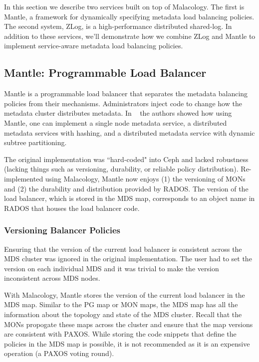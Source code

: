 \documentclass[preprint]{sigplanconf-eurosys}
\begin{document}
In this section we describe two services built on top of Malacology. The first
is Mantle, a framework for dynamically specifying metadata load balancing
policies. The second system, ZLog, is a high-performance distributed shared-log.
In addition to these services, we'll demonstrate how we combine ZLog and Mantle
to implement service-aware metadata load balancing policies.

\subsection{Mantle: Programmable Load Balancer}
\label{sec:mantle}

Mantle is a programmable load balancer that separates the metadata balancing
policies from their mechanisms. Administrators inject code to change how the
metadata cluster distributes metadata. In ~\cite{sevilla:sc15-mantle} the
authors showed how using Mantle, one can implement a single node metadata
service, a distributed metadata services with hashing, and a distributed
metadata service with dynamic subtree partitioning. 

The original implementation was ``hard-coded" into Ceph and lacked robustness
(lacking things such as versioning, durability, or reliable policy
distribution).  Re-implemented using Malacology, Mantle now enjoys (1) the
versioning of MONs and (2) the durability and distribution provided by RADOS.
The version of the load balancer, which is stored in the MDS map, corresponds
to an object name in RADOS that houses the load balancer code.

\subsubsection{Versioning Balancer Policies}

Ensuring that the version of the current load balancer is consistent across the
MDS cluster was ignored in the original implementation. The user had to set the
version on each individual MDS and it was trivial to make the version
inconsistent across MDS nodes.

With Malacology, Mantle stores the version of the current load balancer in the
MDS map.  Similar to the PG map or MON maps, the MDS map has all the
information about the topology and state of the MDS cluster.  Recall that the
MONs propogate these maps across the cluster and ensure that the map versions
are consistent with PAXOS.  While storing the code snippets that define the
policies in the MDS map is possible, it is not recommended as it is an
expensive operation (a PAXOS voting round).
\end{document}
